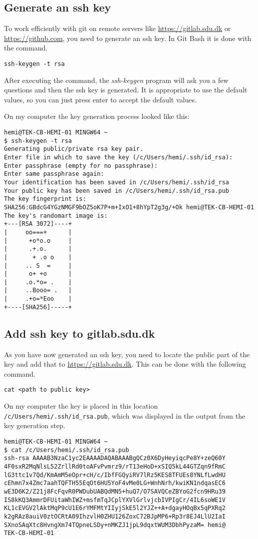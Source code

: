 \subsection{Generate an ssh key}

To work efficiently with git on remote servers like \url{https://gitlab.sdu.dk} or \url{https://github.com}, you need to generate 
an ssh key.
In Git Bash it is done with the command.
\begin{verbatim}
ssh-keygen -t rsa
\end{verbatim}
After executing the command, the \emph{ssh-keygen} program
will ask you a few questions and then the ssh key is generated.
It is appropriate to use the default values, so you can just 
press enter to accept the default values.

On my computer the key generation process looked like this:
\begin{verbatim}
hemi@TEK-CB-HEMI-01 MINGW64 ~
$ ssh-keygen -t rsa
Generating public/private rsa key pair.
Enter file in which to save the key (/c/Users/hemi/.ssh/id_rsa):
Enter passphrase (empty for no passphrase):
Enter same passphrase again:
Your identification has been saved in /c/Users/hemi/.ssh/id_rsa
Your public key has been saved in /c/Users/hemi/.ssh/id_rsa.pub
The key fingerprint is:
SHA256:GBdcG4YGzNMGF9bOZ5oK7P+m+IxO1+8hYpT2g3g/+Ok hemi@TEK-CB-HEMI-01
The key's randomart image is:
+---[RSA 3072]----+
|     oo===+      |
|      +o*o.o     |
|      .+.o.      |
|       + .o o    |
|     .. S  =     |
|      o+ +o      |
|     .o.*o= .    |
|     ..Booo= .   |
|     .+o=*Eoo    |
+----[SHA256]-----+
\end{verbatim}

\subsection{Add ssh key to gitlab.sdu.dk}

As you have now generated an ssh key, you need to locate the 
public part of the key and add that to \url{https://gitlab.sdu.dk}.
This can be done with the following command.
\begin{verbatim}
cat <path to public key>
\end{verbatim}

On my computer the key is placed in this location 
\verb!/c/Users/hemi/.ssh/id_rsa.pub!, which was displayed 
in the output from the key generation step.

\begin{verbatim}
hemi@TEK-CB-HEMI-01 MINGW64 ~
$ cat /c/Users/hemi/.ssh/id_rsa.pub
ssh-rsa AAAAB3NzaC1yc2EAAAADAQABAAABgQCz0X6DyHeyiqcPe8Y+zeQ60Y
4F0sxR2MqNlsL52ZrllRd0toAFvPvmrz9/rT13eHoD+xSIQ5kL44GTZqn9fRmC
lG3ttc1v7Qd/KmAmM5eOpr+cH/c/IbfFGQyiRV7lRz5KES8TFUEs8YNLfLwdHU
cEhmn7x4Zmc7aahTQFTH55EqOt6HU5YoF4vMe0LG+WnhNrh/kwiKN1ndqasEC6
wE3D6K2/Z21j8FcFqvR0PWDubUABQdMN5+huQ7/O7SAVQCeZBYoG2fcn9HRu39
IS8kKQ3AmmrDFUitaWhIWZ+msfmTqJCplYXVlGrlvjcbIVPIgCr/4IL6soWE1V
KL1cEVGV2lAktMqP9cU1E6rYMFMtYIIyjSkE5l2YJZ++A+dgayHOqBx5qPXRq2
k2gRAz8auiV0ztOCRtA09IhzvlH0ZHU126ZoxC72BJpMP6+Rp3r8EJ4LlU2IaI
SXnoSAqXtc8HvngXm74TQpneLSDy+nMKZJ1jpL9dqxtWUM3DbhPyzaM= hemi@
TEK-CB-HEMI-01
\end{verbatim}


